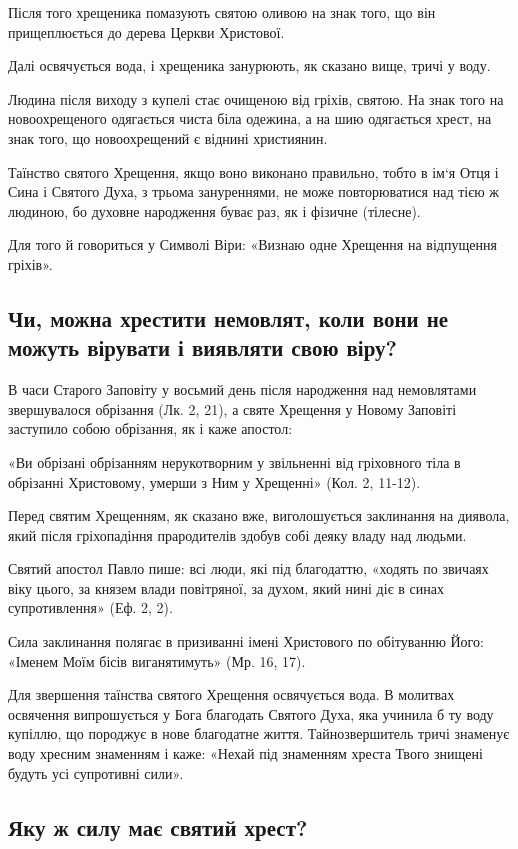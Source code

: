\documentclass[main.tex]{subfiles}
\begin{document}
Після того хрещеника помазують святою оливою на знак того, що він прищеплюється до дерева Церкви Христової.

Далі освячується вода, і хрещеника занурюють, як сказано вище, тричі у воду.

Людина після виходу з купелі стає очищеною від гріхів, святою. На знак того на новоохрещеного одягається чиста біла одежина, а на шию одягається хрест, на знак того, що новоохрещений є віднині християнин.

Таїнство святого Хрещення, якщо воно виконано правильно, тобто в ім`я Отця і Сина і Святого Духа, з трьома зануреннями, не може повторюватися над тією ж людиною, бо духовне народження буває раз, як і фізичне (тілесне).

Для того й говориться у Символі Віри: «Визнаю одне Хрещення на відпущення гріхів».

\subsection{Чи, можна хрестити немовлят, коли вони не можуть вірувати і виявляти свою віру?}

В часи Старого Заповіту у восьмий день після народження над немовлятами звершувалося обрізання (Лк. 2, 21), а святе Хрещення у Новому Заповіті заступило собою обрізання, як і каже апостол:

«Ви обрізані обрізанням нерукотворним у звільненні від гріховного тіла в обрізанні Христовому, умерши з Ним у Хрещенні» (Кол. 2, 11-12).

Перед святим Хрещенням, як сказано вже, виголошується заклинання на диявола, який після гріхопадіння прародителів здобув собі деяку владу над людьми.

Святий апостол Павло пише: всі люди, які під благодаттю, «ходять по звичаях віку цього, за князем влади повітряної, за духом, який нині діє в синах супротивлення» (Еф. 2, 2).

Сила заклинання полягає в призиванні імені Христового по обітуванню Його: «Іменем Моїм бісів виганятимуть» (Мр. 16, 17).

Для звершення таїнства святого Хрещення освячується вода. В молитвах освячення випрошується у Бога благодать Святого Духа, яка учинила б ту воду купіллю, що породжує в нове благодатне життя. Тайнозвершитель тричі знаменує воду хресним знаменням і каже: «Нехай під знаменням хреста Твого знищені будуть усі супротивні сили».

\subsection{Яку ж силу має святий хрест?}
\end{document}
